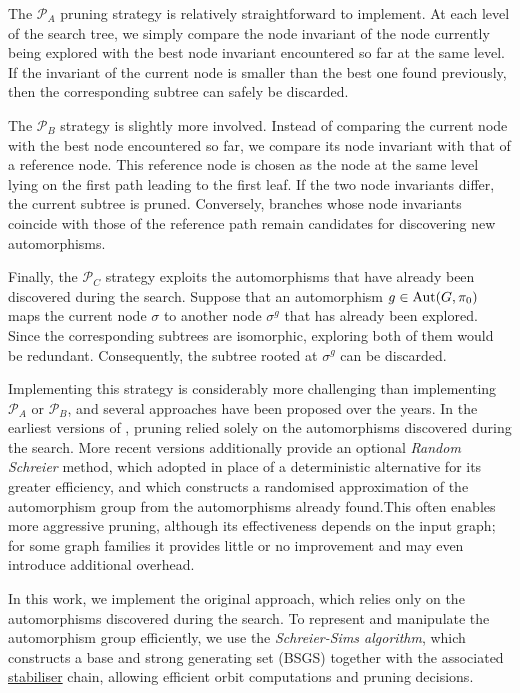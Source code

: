 The $\mathcal{P}_A$ pruning strategy is relatively straightforward to implement. At each level of the search tree, we simply compare the node invariant of the node currently being explored with the best node invariant encountered so far at the same level. If the invariant of the current node is smaller than the best one found previously, then the corresponding subtree can safely be discarded.

The $\mathcal{P}_B$ strategy is slightly more involved. Instead of comparing the current node with the best node encountered so far, we compare its node invariant with that of a reference node. This reference node is chosen as the node at the same level lying on the first path leading to the first leaf. If the two node invariants differ, the current subtree is pruned. Conversely, branches whose node invariants coincide with those of the reference path remain candidates for discovering new automorphisms.

Finally, the $\mathcal{P}_C$ strategy exploits the automorphisms that have already been discovered during the search. Suppose that an automorphism $g \in \operatorname{Aut}(G,\pi_0)$ maps the current node $\sigma$ to another node $\sigma^g$ that has already been explored. Since the corresponding subtrees are isomorphic, exploring both of them would be redundant. Consequently, the subtree rooted at $\sigma^g$ can be discarded.

Implementing this strategy is considerably more challenging than implementing $\mathcal{P}_A$ or $\mathcal{P}_B$, and several approaches have been proposed over the years. In the earliest versions of \Naut{}, pruning relied solely on the automorphisms discovered during the search. More recent versions additionally provide an optional \textit{Random Schreier} method, which \Naut{} adopted in place of a deterministic alternative for its greater efficiency, and which constructs a randomised approximation of the automorphism group from the automorphisms already found.This often enables more aggressive pruning, although its effectiveness depends on the input graph; for some graph families it provides little or no improvement and may even introduce additional overhead.

In this work, we implement the original approach, which relies only on the automorphisms discovered during the search. To represent and manipulate the automorphism group efficiently, we use the \textit{Schreier-Sims algorithm}, which constructs a base and strong generating set (BSGS) together with the associated \hyperref[def:stabiliser]{stabiliser} chain, allowing efficient orbit computations and pruning decisions.

